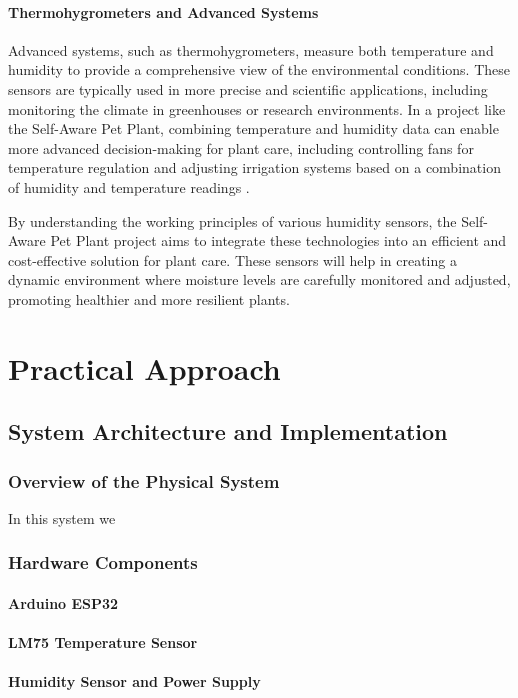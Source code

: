 \documentclass[12pt,a4paper,oneside,english]{book}
\begin{document}
\subsubsection{Thermohygrometers and Advanced Systems}

Advanced systems, such as thermohygrometers, measure both temperature and humidity to provide a comprehensive view of the environmental conditions. These sensors are typically used in more precise and scientific applications, including monitoring the climate in greenhouses or research environments. In a project like the Self-Aware Pet Plant, combining temperature and humidity data can enable more advanced decision-making for plant care, including controlling fans for temperature regulation and adjusting irrigation systems based on a combination of humidity and temperature readings \cite{banda2020smart}.

By understanding the working principles of various humidity sensors, the Self-Aware Pet Plant project aims to integrate these technologies into an efficient and cost-effective solution for plant care. These sensors will help in creating a dynamic environment where moisture levels are carefully monitored and adjusted, promoting healthier and more resilient plants.


\chapter{Practical Approach}
\section{System Architecture and Implementation}
\subsection{Overview of the Physical System}
In this system we 
\subsection{Hardware Components}
\subsubsection{Arduino ESP32}
\subsubsection{LM75 Temperature Sensor}
\subsubsection{Humidity Sensor and Power Supply}
\end{document}
